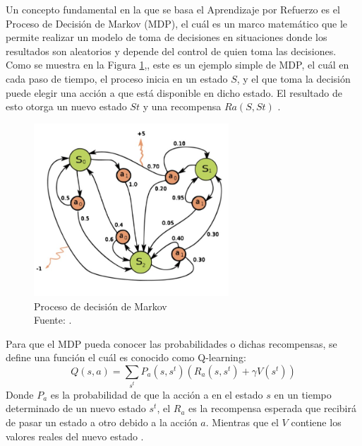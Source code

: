 \begin{itemize}
	Un concepto fundamental en la que se basa el Aprendizaje por Refuerzo es el Proceso de Decisión de Markov (MDP), el cuál es un marco matemático que le permite realizar un modelo de toma de decisiones en situaciones donde los resultados son aleatorios y depende del control de quien toma las decisiones. Como se muestra en la Figura \ref{1:mark},, este es un ejemplo simple de MDP, el cuál en cada paso de tiempo, el proceso inicia en un estado $S$, y el que toma la decisión puede elegir una acción a que está disponible en dicho estado. El resultado de esto otorga un nuevo estado $St$ y una recompensa $Ra (S, St)$ \parencite{gl_markov}.
\begin{figure}[h]
	\begin{center}
		\includegraphics[width=0.65\textwidth]{2/MT/2.jpg}
		\caption{Proceso de decisión de Markov \\
			Fuente: \citep*{gl_markov}. }
		\label{1:mark}
	\end{center}
\end{figure}

Para que el MDP pueda conocer las probabilidades o dichas recompensas, se define una función el cuál es conocido como Q-learning:
\begin{equation} 
Q(s,a) = \sum_{s^{t}}P_{a}(s,s^{t})(R_{a}(s,s^{t})+\gamma V(s^{t}))
\end{equation}
Donde $P_{a}$ es la probabilidad de que la acción a en el estado $s$ en un tiempo determinado de un nuevo estado $s^{t}$, el $R_{a}$ es la recompensa esperada que recibirá de pasar un estado a otro debido a la acción $a$. Mientras que el $V$ contiene los valores reales del nuevo estado \parencite{gl_markov}.

\end{itemize}
